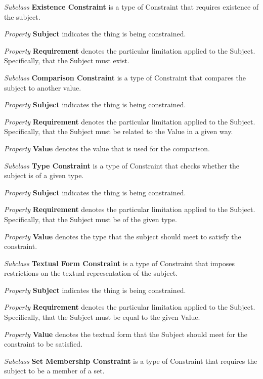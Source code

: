 \begin{description}
\item\textit{Subclass} \textbf{Existence Constraint} is a type of Constraint that requires existence of the subject. 

\textit{Property} \textbf{Subject} indicates the thing is being constrained.

\textit{Property} \textbf{Requirement} denotes the particular limitation applied to the Subject. Specifically, that the Subject must exist.


\item\textit{Subclass} \textbf{Comparison Constraint} is a type of Constraint that compares the subject to another value.

\textit{Property} \textbf{Subject} indicates the thing is being constrained.

\textit{Property} \textbf{Requirement} denotes the particular limitation applied to the Subject. Specifically, that the Subject must be related to the Value in a given way.

\textit{Property} \textbf{Value} denotes the value that is used for the comparison.


\item\textit{Subclass} \textbf{Type Constraint} is a type of Constraint that checks whether the subject is of a given type.

\textit{Property} \textbf{Subject} indicates the thing is being constrained.

\textit{Property} \textbf{Requirement} denotes the particular limitation applied to the Subject. Specifically, that the Subject must be of the given type.

\textit{Property} \textbf{Value} denotes the type that the subject should meet to satisfy the constraint.


\item\textit{Subclass} \textbf{Textual Form Constraint} is a type of Constraint that imposes restrictions on the textual representation of the subject.

\textit{Property} \textbf{Subject} indicates the thing is being constrained.

\textit{Property} \textbf{Requirement} denotes the particular limitation applied to the Subject. Specifically, that the Subject must be equal to the given Value.

\textit{Property} \textbf{Value} denotes the textual form that the Subject should meet for the constraint to be satisfied.


\item\textit{Subclass} \textbf{Set Membership Constraint} is a type of Constraint that requires the subject to be a member of a set.


\end{description}
